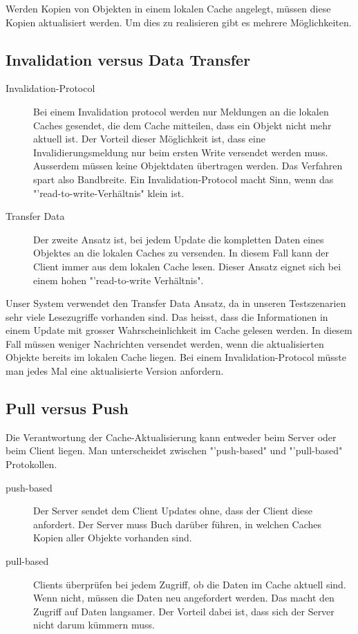 Werden Kopien von Objekten in einem lokalen Cache angelegt, müssen diese Kopien aktualisiert werden. Um dies zu realisieren gibt es mehrere Möglich\-keiten.

\subsection{Invalidation versus Data Transfer}
\label{sec:inval-vers-data}

\begin{description}
\item[Invalidation-Protocol] Bei einem Invalidation protocol werden nur Meldungen an die lokalen Caches gesendet, die dem Cache mitteilen, dass ein Objekt nicht mehr aktuell ist. Der Vorteil dieser Möglichkeit ist, dass eine Invalidierungsmeldung nur beim ersten Write versendet werden muss. Ausserdem müssen keine Objektdaten übertragen werden. Das Verfahren spart also Bandbreite. Ein Invalidation-Protocol macht Sinn, wenn das "'read-to-write-Verhältnis" klein ist.
\item[Transfer Data] Der zweite Ansatz ist, bei jedem Update die kompletten Daten eines Objektes an die lokalen Caches zu versenden. In diesem Fall kann der Client immer aus dem lokalen Cache lesen. Dieser Ansatz eignet sich bei einem hohen "'read-to-write Verhältnis".
\end{description}

Unser System verwendet den Transfer Data Ansatz, da in unseren Testszenarien sehr viele Lesezugriffe vorhanden sind. Das heisst, dass die Informationen in einem Update mit grosser Wahrscheinlichkeit im Cache gelesen werden. In diesem Fall müssen weniger Nachrichten versendet werden, wenn die aktualisierten Objekte bereits im lokalen Cache liegen. Bei einem Invalidation-Protocol müsste man jedes Mal eine aktualisierte Version anfordern.

\subsection{Pull versus Push}
\label{sec:pull-versus-push}

Die Verantwortung der Cache-Aktualisierung kann entweder beim Server oder beim Client liegen. Man unterscheidet zwischen "'push-based" und "'pull-based" Protokollen.

\begin{description}
\item[push-based] Der Server sendet dem Client Updates ohne, dass der Client diese anfordert. Der Server muss Buch darüber führen, in welchen Caches Kopien aller Objekte vorhanden sind.
\item[pull-based] Clients überprüfen bei jedem Zugriff, ob die Daten im Cache aktuell sind. Wenn nicht, müssen die Daten neu angefordert werden. Das macht den Zugriff auf Daten langsamer. Der Vorteil dabei ist, dass sich der Server nicht darum kümmern muss.
\end{description}

